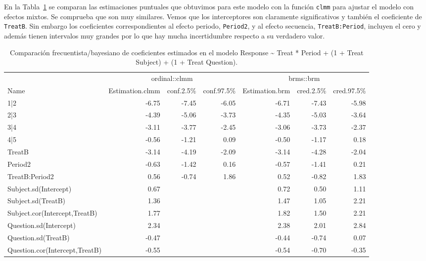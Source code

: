 \documentclass[
  12pt,
  a4paper,
  extrafontsizes,
  onecolumn,
  openright]{memoir}
\begin{document}
\normalsize

En la Tabla~\ref{tbl-model-comp} se comparan las estimaciones puntuales
que obtuvimos para este modelo con la función \texttt{clmm} para ajustar
el modelo con efectos mixtos. Se comprueba que son muy similares. Vemos
que los interceptores son claramente significativos y también el
coeficiente de \texttt{TreatB}. Sin embargo los coeficientes
correspondientes al efecto periodo, \texttt{Period2}, y al efecto
secuencia, \texttt{TreatB:Period}, incluyen el cero y además tienen
intervalos muy grandes por lo que hay mucha incertidumbre respecto a su
verdadero valor.

\tiny

\hypertarget{tbl-model-comp}{}
\begin{longtable}{lrrrrrr}
\caption{\label{tbl-model-comp}Comparación frecuentista/bayesiano de coeficientes estimados en el
modelo Response \textasciitilde{} Treat * Period + (1 + Treat \textbar{}
Subject) + (1 + Treat \textbar{} Question). }\tabularnewline

\toprule
 & \multicolumn{3}{c}{ordinal::clmm} & \multicolumn{3}{c}{brms::brm} \\ 
\cmidrule(lr){2-4} \cmidrule(lr){5-7}
Name & Estimation.clmm & conf.2.5\% & conf.97.5\% & Estimation.brm & cred.2.5\% & cred.97.5\% \\ 
\midrule
1|2 & -6.75 & -7.45 & -6.05 & -6.71 & -7.43 & -5.98 \\ 
2|3 & -4.39 & -5.06 & -3.73 & -4.35 & -5.03 & -3.64 \\ 
3|4 & -3.11 & -3.77 & -2.45 & -3.06 & -3.73 & -2.37 \\ 
4|5 & -0.56 & -1.21 & 0.09 & -0.50 & -1.17 & 0.18 \\ 
TreatB & -3.14 & -4.19 & -2.09 & -3.14 & -4.28 & -2.04 \\ 
Period2 & -0.63 & -1.42 & 0.16 & -0.57 & -1.41 & 0.21 \\ 
TreatB:Period2 & 0.56 & -0.74 & 1.86 & 0.52 & -0.82 & 1.83 \\ 
Subject.sd(Intercept) & 0.67 &  &  & 0.72 & 0.50 & 1.11 \\ 
Subject.sd(TreatB) & 1.36 &  &  & 1.47 & 1.05 & 2.21 \\ 
Subject.cor(Intercept,TreatB) & 1.77 &  &  & 1.82 & 1.50 & 2.21 \\ 
Question.sd(Intercept) & 2.34 &  &  & 2.38 & 2.01 & 2.84 \\ 
Question.sd(TreatB) & -0.47 &  &  & -0.44 & -0.74 & 0.07 \\ 
Question.cor(Intercept,TreatB) & -0.55 &  &  & -0.54 & -0.70 & -0.35 \\ 
\bottomrule
\end{longtable}
\end{document}
